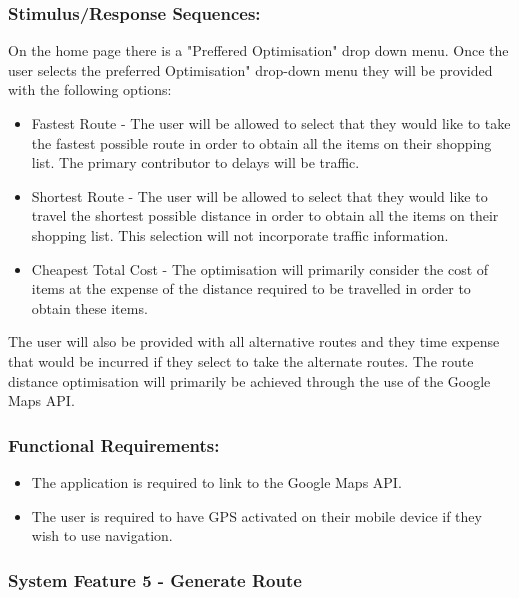 \documentclass[10pt,twocolumn]{witseiepaper}
\begin{document}
		\subsubsection*{Stimulus/Response Sequences:}
		
		On the home page there is a "Preffered Optimisation" drop down menu. Once the user selects the preferred Optimisation" drop-down menu they will be provided with the following options:
		
		\begin{itemize}
			\item Fastest Route - The user will be allowed to select that they would like to take the fastest possible route in order to obtain all the items on their shopping list. The primary contributor to delays will be traffic.
			\item Shortest Route - The user will be allowed to select that they would like to travel the shortest possible distance in order to obtain all the items on their shopping list. This selection will not incorporate traffic information.
			\item Cheapest Total Cost - The optimisation will primarily consider the cost of items at the expense of the distance required to be travelled in order to obtain these items. 
		\end{itemize}
		
		The user will also be provided with all alternative routes and they time expense that would be incurred if they select to take the alternate routes. The route distance optimisation will primarily be achieved through the use of the Google Maps API.
		
		\subsubsection*{Functional Requirements:}
		
		\begin{itemize}
			\item The application is required to link to the Google Maps API. 
			\item The user is required to have GPS activated on their mobile device if they wish to use navigation.
		\end{itemize}
		
		\subsubsection{System Feature 5 - Generate Route}
		
\end{document}
